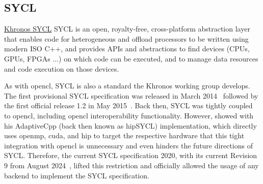 \subsection{SYCL}
\label{sec:frameworks:sycl}

\begin{quotebox}{\href{https://www.khronos.org/sycl/}{Khronos SYCL}}
    SYCL is an open, royalty-free, cross-platform abstraction layer that enables code for heterogeneous and offload processors to be written using modern ISO C++, and provides APIs and abstractions to find devices (CPUs, GPUs, FPGAs ...) on which code can be executed, and to manage data resources and code execution on those devices.
\end{quotebox}

As with \gls{opencl}, SYCL is also a standard the Khronos working group develops. 
The first provisional SYCL specification was released in March 2014~\cite{khronos_sycl_working_group_khronos_2014} followed by the first official release 1.2 in May 2015~\cite{khronos_sycl_working_group_khronos_2015}. 
Back then, SYCL was tightly coupled to \gls{opencl}, including \gls{opencl} interoperability functionality. 
However, \citet{alpay_sycl_2020} showed with his AdaptiveCpp (back then known as hipSYCL) implementation, which directly uses \gls{openmp}, \gls{cuda}, and \gls{hip} to target the respective hardware that this tight integration with \gls{opencl} is unnecessary and even hinders the future directions of SYCL. 
Therefore, the current SYCL specification 2020, with its current Revision 9 from August 2024~\cite{khronos_sycl_working_group_sycl_2024}, lifted this restriction and officially allowed the usage of any backend to implement the SYCL specification. 

